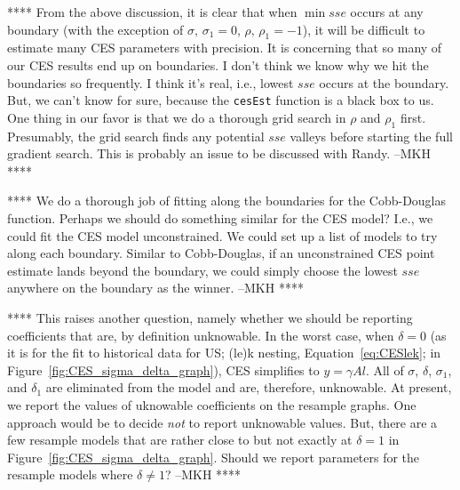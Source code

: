 \documentclass[preprint,authoryear,12pt]{elsarticle}\usepackage[]{graphicx}\usepackage[]{color}
\begin{document}
**** From the above discussion, 
it is clear that when $\min{sse}$ occurs at any boundary 
(with the exception of $\sigma, \, \sigma_1 = 0$, $\rho, \, \rho_1 = -1$), 
it will be difficult to estimate many CES parameters with precision.
It is concerning that so many of our CES results end up on boundaries. 
I don't think we know why we hit the boundaries so frequently. 
I think it's real, i.e., lowest $sse$ occurs at the boundary. 
But, we can't know for sure, because the \texttt{cesEst} function
is a black box to us.
One thing in our favor is that we do a thorough grid search in $\rho$ and $\rho_1$ first.
Presumably, the grid search finds any potential 
$sse$ valleys before starting the full gradient search. 
This is probably an issue to be discussed with Randy. --MKH ****

**** We do a thorough job of fitting along the boundaries for the Cobb-Douglas function.
Perhaps we should do something similar for the CES model? 
I.e., we could fit the CES model unconstrained.
We could set up a list of models to try along each boundary. 
Similar to Cobb-Douglas, if an unconstrained CES point estimate lands beyond the boundary,
we could simply choose the lowest $sse$ anywhere on the boundary as the winner. --MKH ****

**** This raises another question,
namely whether we should be reporting coefficients that are, by definition unknowable.
In the worst case, when $\delta = 0$ 
(as it is for the fit to historical data for 
US;
(le)k nesting, Equation~\ref{eq:CESlek}; in Figure~\ref{fig:CES_sigma_delta_graph}), 
CES simplifies to $y = \gamma A l$.
All of $\sigma$, $\delta$, $\sigma_1$, and $\delta_1$
are eliminated from the model
and are, therefore, unknowable.  
At present, we report the values of uknowable coefficients on the resample graphs.
One approach would be to decide \emph{not} to report unknowable values.
But, there are a few resample models that are rather close to but not exactly at $\delta = 1$
in Figure~\ref{fig:CES_sigma_delta_graph}.
Should we report parameters for the resample models where $\delta \ne 1$? --MKH ****
\end{document}
